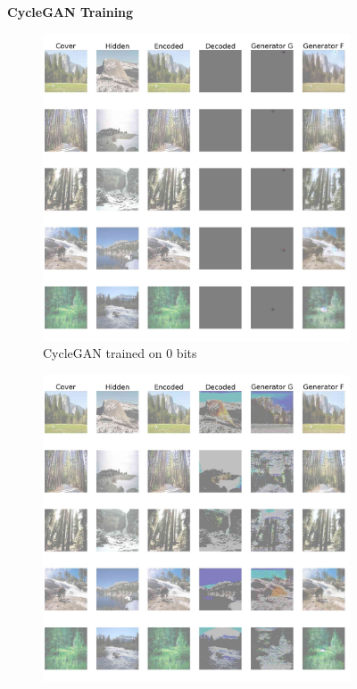 \documentclass[conference]{IEEEtran}
\begin{document}
\begin{figure}[!hbt]
\centering
\textbf{CycleGAN Training}\par\medskip
    \begin{subfigure}[b]{0.28\textwidth}
    \centering
            \includegraphics[scale=0.08]{images/cycle_sten_0.jpg}
            \caption{CycleGAN trained on 0 bits}
            \label{cycle_gan_0}
    \end{subfigure}
    \hspace{0.05\textwidth}
    \begin{subfigure}[b]{0.28\textwidth}
    \centering
            \includegraphics[scale=0.08]{images/cycle_sten_1.jpg}

\end{subfigure}
\end{figure}
\end{document}

